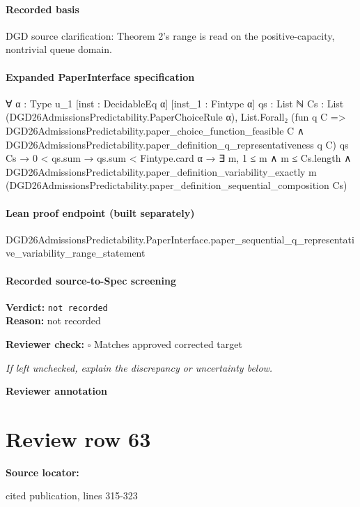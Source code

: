 \documentclass[10pt]{article}
\newcommand{\reviewerbox}{%
  \par\noindent\fbox{\parbox{0.96\linewidth}{\rule{0pt}{0.38in}}}\par
}
\newcommand{\reviewmatch}[1]{%
  \par\noindent\textbf{Reviewer check:} $\square$\; #1\par
  \noindent\emph{If left unchecked, explain the discrepancy or uncertainty below.}\par
}
\begin{document}
\paragraph{Recorded basis}
DGD source clarification:\allowbreak{} Theorem 2's range is read on the positive-\allowbreak{}capacity, nontrivial queue domain.\allowbreak{}
\paragraph{Expanded PaperInterface specification}
\begin{ReviewVerbatim}
∀ {α : Type u_1} [inst : DecidableEq α] [inst_1 : Fintype α] {qs : List ℕ}
  {Cs : List (DGD26AdmissionsPredictability.PaperChoiceRule α)},
  List.Forall₂
      (fun q C =>
        DGD26AdmissionsPredictability.paper_choice_function_feasible C ∧
          DGD26AdmissionsPredictability.paper_definition_q_representativeness q C)
      qs Cs →
    0 < qs.sum →
      qs.sum < Fintype.card α →
        ∃ m,
          1 ≤ m ∧
            m ≤ Cs.length ∧
              DGD26AdmissionsPredictability.paper_definition_variability_exactly m
                (DGD26AdmissionsPredictability.paper_definition_sequential_composition Cs)
\end{ReviewVerbatim}

\paragraph{Lean proof endpoint (built separately)}\begin{ReviewVerbatim}
DGD26AdmissionsPredictability.PaperInterface.paper_sequential_q_representative_variability_range_statement
\end{ReviewVerbatim}

\paragraph{Recorded source-to-Spec screening}
\textbf{Verdict:} \texttt{not recorded}
\\
\textbf{Reason:} not recorded
\reviewmatch{Matches approved corrected target}
\noindent\textbf{Reviewer annotation}\par
\reviewerbox
\clearpage
\hypertarget{source-claim-26bfa3509b616c5d}{}
\section*{Review row 63}
\textbf{Source locator:} {\footnotesize\raggedright cited publication, lines 315-\allowbreak{}323\par}
\end{document}
